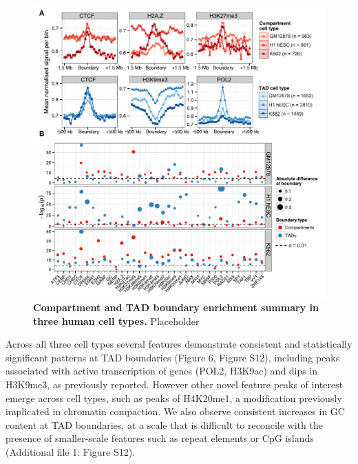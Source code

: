 \documentclass[a4paper,10pt,oneside]{book}
\begin{document}
\begin{figure}
\begin{center} 
\includegraphics[width=\textwidth]{figs/boundarysummary.pdf}
\captionsetup{width=\textwidth}
\caption{ {\bf Compartment and TAD boundary enrichment summary in three human cell types.}
Placeholder
}\label{fig:boundarysummary}
\end{center}
\end{figure} 

Across all three cell types several features demonstrate consistent
and statistically significant patterns at TAD boundaries (Figure 6,
Figure S12), including peaks associated with active transcription of
genes (POL2, H3K9ac) and dips in H3K9me3, as previously reported.\cite{Dixon2012} However other novel feature peaks of interest emerge
across cell types, such as peaks of H4K20me1, a modification
previously implicated in chromatin compaction.\cite{Evertts2013} We also observe consistent increases in GC content at TAD boundaries, at a scale that is difficult to reconcile with the presence of smaller-scale features such as repeat elements or CpG islands (Additional file 1: Figure S12).
\end{document}
